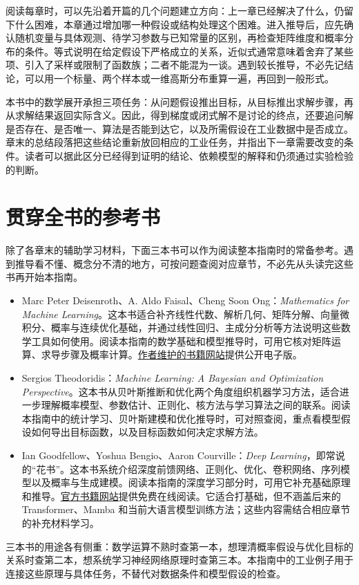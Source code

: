 ﻿\documentclass[a4paper,UTF8,zihao=-4,openany]{ctexbook}
\begin{document}
阅读每章时，可以先沿着开篇的几个问题建立方向：上一章已经解决了什么，仍留下什么困难，本章通过增加哪一种假设或结构处理这个困难。进入推导后，应先确认随机变量与具体观测、待学习参数与已知常量的区别，再检查矩阵维度和概率分布的条件。等式说明在给定假设下严格成立的关系，近似式通常意味着舍弃了某些项、引入了采样或限制了函数族；二者不能混为一谈。遇到较长推导，不必先记结论，可以用一个标量、两个样本或一维高斯分布重算一遍，再回到一般形式。

本书中的数学展开承担三项任务：从问题假设推出目标，从目标推出求解步骤，再从求解结果返回实际含义。因此，得到梯度或闭式解不是讨论的终点，还要追问解是否存在、是否唯一、算法是否能到达它，以及所需假设在工业数据中是否成立。章末的总结段落把这些结论重新放回相应的工业任务，并指出下一章需要改变的条件。读者可以据此区分已经得到证明的结论、依赖模型的解释和仍须通过实验检验的判断。

\section*{贯穿全书的参考书}
除了各章末的辅助学习材料，下面三本书可以作为阅读整本指南时的常备参考。遇到推导看不懂、概念分不清的地方，可按问题查阅对应章节，不必先从头读完这些书再开始本指南。
\begin{itemize}
 \item Marc Peter Deisenroth、A. Aldo Faisal、Cheng Soon Ong：\textit{Mathematics for Machine Learning}。这本书适合补齐线性代数、解析几何、矩阵分解、向量微积分、概率与连续优化基础，并通过线性回归、主成分分析等方法说明这些数学工具如何使用。阅读本指南的数学基础和模型推导时，可用它核对矩阵运算、求导步骤及概率计算。\href{https://mml-book.com}{作者维护的书籍网站}提供公开电子版。
 \item Sergios Theodoridis：\textit{Machine Learning: A Bayesian and Optimization Perspective}。这本书从贝叶斯推断和优化两个角度组织机器学习方法，适合进一步理解概率模型、参数估计、正则化、核方法与学习算法之间的联系。阅读本指南中的统计学习、贝叶斯建模和优化推导时，可对照查阅，重点看模型假设如何导出目标函数，以及目标函数如何决定求解方法。
 \item Ian Goodfellow、Yoshua Bengio、Aaron Courville：\textit{Deep Learning}，即常说的“花书”。这本书系统介绍深度前馈网络、正则化、优化、卷积网络、序列模型以及概率与生成建模。阅读本指南的深度学习部分时，可用它补充基础原理和推导。\href{https://www.deeplearningbook.org/}{官方书籍网站}提供免费在线阅读。它适合打基础，但不涵盖后来的 Transformer、Mamba 和当前大语言模型训练方法；这些内容需结合相应章节的补充材料学习。
\end{itemize}
三本书的用途各有侧重：数学运算不熟时查第一本，想理清概率假设与优化目标的关系时查第二本，想系统学习神经网络原理时查第三本。本指南中的工业例子用于连接这些原理与具体任务，不替代对数据条件和模型假设的检查。
\end{document}

